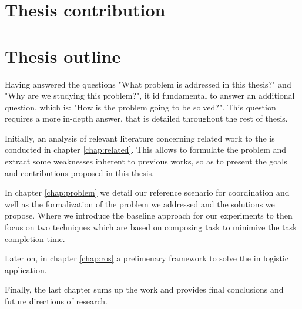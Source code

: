 \section{Thesis contribution}


\section{Thesis outline}


Having answered the questions "What problem is addressed in this thesis?" and 
"Why are we studying this problem?", it id fundamental to answer an additional question,
which is: "How is the problem going to be solved?". This question requires a more 
in-depth answer, that is detailed throughout the rest of thesis.

Initially, an analysis of relevant literature concerning related work to the \mrs 
is conducted in chapter \ref{chap:related}. This allows to formulate the problem 
and extract some weaknesses inherent to previous works, so as to present the goals and contributions
proposed in this thesis.

In chapter \ref{chap:problem} we detail our reference scenario for \mrs coordination and 
well as the formalization of the problem we addressed and the solutions we propose.
Where we introduce the baseline approach for our experiments to then focus on two techniques
which are based on composing task to minimize the task completion time.

Later on, in chapter \ref{chap:ros} a prelimenary framework to solve the \mrs in logistic 
application. 

Finally, the last chapter sums up the work and provides final conclusions and future
directions of research.





